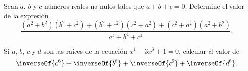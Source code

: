 \begin{section-problem}
    Sean $a$, $b$ y $c$ números reales no nulos tales que $a + b + c = 0$.
    Determine el valor de la expresión
    \[\frac{(a^2 + b^2)(b^2 + c^2) + (b^2 + c^2)(c^2 + a^2) + (c^2 + a^2)(a^2 + b^2)}{a^4 + b^4 + c^4}.\]
    \vspace{-4mm}
\end{section-problem}

\begin{section-problem}
    Si $a$, $b$, $c$ y $d$ son las raíces de la ecuación $x^4 - 3x^3 + 1 = 0$,
    calcular el valor de
    \[\inverseOf{a^6} + \inverseOf{b^6} + \inverseOf{c^6} + \inverseOf{d^6}.\]
\end{section-problem}